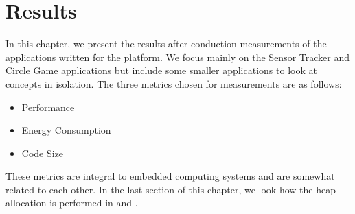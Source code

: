 
\chapter{Results}
\label{chap:results}

In this chapter, we present the results after conduction measurements of the applications written for the {\rg} platform.
We focus mainly on the Sensor Tracker and Circle Game applications but include some smaller applications to look at concepts in isolation.
The three metrics chosen for measurements are as follows:
\begin{itemize}
  \item Performance
  \item Energy Consumption
  \item Code Size
\end{itemize}
These metrics are integral to embedded computing systems and are somewhat related to each other.
In the last section of this chapter, we look how the heap allocation is performed in {\rust} and {\C}.





